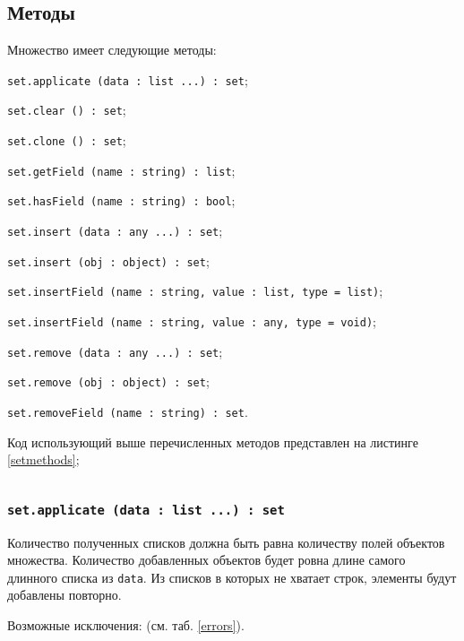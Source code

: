 \subsection{Методы}

Множество имеет следующие методы:
\begin{icItems}
\item \texttt{set.applicate (data : list ...) : set};
\item \texttt{set.clear () : set};
\item \texttt{set.clone () : set};
\item \texttt{set.getField (name : string) : list};
\item \texttt{set.hasField (name : string) : bool};
\item \texttt{set.insert (data : any ...) : set};
\item \texttt{set.insert (obj : object) : set};
\item \texttt{set.insertField (name : string, value : list, type = list)};
\item \texttt{set.insertField (name : string, value : any, type = void)};
\item \texttt{set.remove (data : any ...) : set};
\item \texttt{set.remove (obj : object) : set};
\item \texttt{set.removeField (name : string) : set}.
\end{icItems}

Код использующий выше перечисленных методов представлен на листинге \ref{setmethods};

\begin{sourcecode}
	\label{setmethods}
    \inputminted[linenos]{icl}{../sources/setmethods.icL}
\end{sourcecode}

\subsubsection{\texttt{set.applicate (data : list ...) : set}}

Количество полученных списков должна быть равна количеству полей объектов множества. Количество добавленных объектов будет ровна длине самого длинного списка из \texttt{data}. Из списков в которых не хватает строк, элементы будут добавлены повторно.

Возможные исключения:  (см. таб. \ref{errors}).

